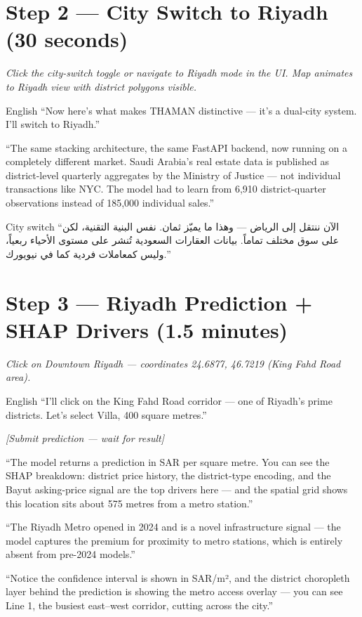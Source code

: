 \documentclass[11pt, a4paper, twoside]{article}
\begin{document}
\section{Step 2 --- City Switch to Riyadh (30 seconds)}
\label{sec:switch}

\noindent\textit{Click the city-switch toggle or navigate to Riyadh mode in the
UI. Map animates to Riyadh view with district polygons visible.}

\begin{narration}{English}
``Now here's what makes THAMAN distinctive --- it's a dual-city system. I'll
switch to Riyadh.''

``The same stacking architecture, the same FastAPI backend, now running on a
completely different market. Saudi Arabia's real estate data is published as
district-level quarterly aggregates by the Ministry of Justice --- not individual
transactions like NYC. The model had to learn from 6,910 district-quarter
observations instead of 185,000 individual sales.''
\end{narration}

\begin{arabic}{City switch}
``الآن ننتقل إلى الرياض --- وهذا ما يميّز ثمان. نفس البنية التقنية، لكن على سوق
مختلف تماماً. بيانات العقارات السعودية تُنشر على مستوى الأحياء ربعياً، وليس
كمعاملات فردية كما في نيويورك.''
\end{arabic}

\section{Step 3 --- Riyadh Prediction + SHAP Drivers (1.5 minutes)}
\label{sec:riyadh}

\noindent\textit{Click on Downtown Riyadh --- coordinates 24.6877, 46.7219
(King Fahd Road area).}

\begin{narration}{English}
``I'll click on the King Fahd Road corridor --- one of Riyadh's prime districts.
Let's select Villa, 400 square metres.''

\textit{[Submit prediction --- wait for result]}

``The model returns a prediction in SAR per square metre. You can see the SHAP
breakdown: district price history, the district-type encoding, and the Bayut
asking-price signal are the top drivers here --- and the spatial grid shows this
location sits about 575 metres from a metro station.''

``The Riyadh Metro opened in 2024 and is a novel infrastructure signal --- the
model captures the premium for proximity to metro stations, which is entirely
absent from pre-2024 models.''

``Notice the confidence interval is shown in SAR/m², and the district
choropleth layer behind the prediction is showing the metro access overlay ---
you can see Line 1, the busiest east--west corridor, cutting across the city.''
\end{narration}
\end{document}
